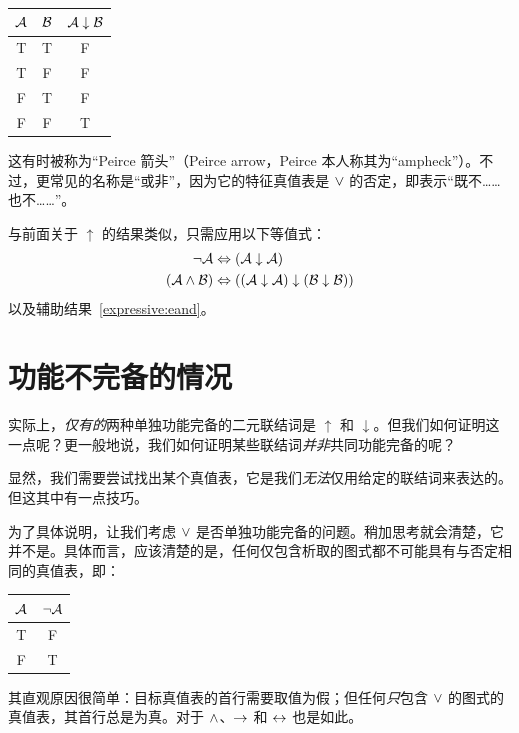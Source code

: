 \begin{center}
\begin{tabular}{c c | c}
$\mathcal{A}$ & $\mathcal{B}$ & $\mathcal{A} \mathrel{\downarrow} \mathcal{B}$\\
\hline
 T & T & F \\
 T & F & F  \\
 F & T & F  \\
 F & F & T
\end{tabular}
\end{center}

这有时被称为“Peirce 箭头”（Peirce arrow，Peirce 本人称其为“ampheck”）。不过，更常见的名称是“或非”，因为它的特征真值表是 $\vee$ 的否定，即表示“既不……也不……”。

与前面关于 $\uparrow$ 的结果类似，只需应用以下等值式：
		\begin{align*}
			\neg \mathcal{A} &\Leftrightarrow (\mathcal{A} \downarrow \mathcal{A})\\
			(\mathcal{A} \wedge \mathcal{B}) & \Leftrightarrow ((\mathcal{A} \downarrow \mathcal{A}) \downarrow (\mathcal{B} \downarrow \mathcal{B}))
		\end{align*}
以及辅助结果~\ref*{expressive:eand}。

\section{功能不完备的情况}

实际上，\emph{仅有的}两种单独功能完备的二元联结词是 $\uparrow$ 和 $\downarrow$。但我们如何证明这一点呢？更一般地说，我们如何证明某些联结词\emph{并非}共同功能完备的呢？

显然，我们需要尝试找出某个真值表，它是我们\emph{无法}仅用给定的联结词来表达的。但这其中有一点技巧。

为了具体说明，让我们考虑 $\vee$ 是否单独功能完备的问题。稍加思考就会清楚，它并不是。具体而言，应该清楚的是，任何仅包含析取的图式都不可能具有与否定相同的真值表，即：

\begin{center}
				\begin{tabular}{c | c}
				$\mathcal{A}$ & $\neg \mathcal{A}$\\
				\hline
				 T & F \\
				 F & T
				\end{tabular}
				\end{center}

其直观原因很简单：目标真值表的首行需要取值为假；但任何\emph{只}包含 $\vee$ 的图式的真值表，其首行总是为真。对于 $\wedge$、$\rightarrow$ 和 $\leftrightarrow$ 也是如此。

